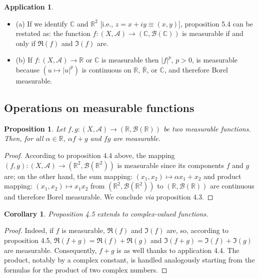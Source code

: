 \documentclass[12pt]{article}
\newtheorem{proposition}{Proposition}[section]
\newtheorem{corollary}{Corollary}[section]
\theoremstyle{definition}
\newtheorem{application}{Application}[section]
\begin{document}
\begin{application}
    \begin{itemize}
    \item (a) If we identify $\mathbb{C}$ and $\mathbb{R}^2$ [i.e., $z = x + iy \equiv (x, y)$], proposition 5.4 can be restated as: the function $f : (X, \mathscr{A}) \to (\mathbb{C}, \mathscr{B}(\mathbb{C}))$ is measurable if and only if $\Re(f)$ and $\Im(f)$ are.

    \item (b) If $f : (X, \mathscr{A}) \to \mathbb{R}$ or $\mathbb{C}$ is measurable then $|f|^p$, $p > 0$, is measurable because $(u \mapsto |u|^p)$ is continuous on $\mathbb{R}$, $\overline{\mathbb{R}}$, or $\mathbb{C}$, and therefore Borel measurable.
\end{itemize}
\end{application}

\subsection{Operations on measurable functions}

\begin{proposition}
    Let $f, g : (X, \mathscr{A}) \to (\mathbb{R}, \mathscr{B}(\mathbb{R}))$ be two measurable functions. Then, for all $\alpha \in \mathbb{R}$, $\alpha f + g$ and $f g$ are measurable.
\end{proposition}
\begin{proof}
    According to proposition 4.4 above, the mapping $(f, g) : (X, \mathscr{A}) \to (\mathbb{R}^2, \mathscr{B}(\mathbb{R}^2))$ is measurable since its components $f$ and $g$ are; on the other hand, the sum mapping: $(x_1, x_2) \mapsto \alpha x_1 + x_2$ and product mapping: $(x_1, x_2) \mapsto x_1 x_2$ from $(\mathbb{R}^2, \mathscr{B}(\mathbb{R}^2))$ to $(\mathbb{R}, \mathscr{B}(\mathbb{R}))$ are continuous and therefore Borel measurable. We conclude \textit{via} proposition 4.3. 
\end{proof}

\begin{corollary}
    Proposition 4.5 extends to complex-valued functions.
\end{corollary}
\begin{proof}
    Indeed, if $f$ is measurable, $\Re(f)$ and $\Im(f)$ are, so, according to proposition 4.5, $\Re(f+g) = \Re(f) + \Re(g)$ and $\Im(f+g) = \Im(f) + \Im(g)$ are measurable. Consequently, $f+g$ is as well thanks to application 4.4. The product, notably by a complex constant, is handled analogously starting from the formulas for the product of two complex numbers. 
\end{proof}
\end{document}
